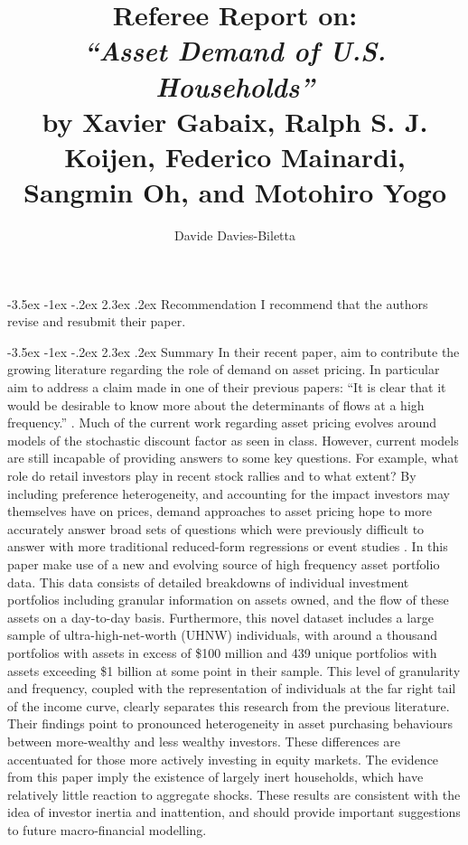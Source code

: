 \documentclass[]{article}
\title{Referee Report on:\\
	 \textit{``Asset Demand of U.S. Households''}\\
	 \bb
	  \large{by Xavier Gabaix, Ralph S. J. Koijen, Federico Mainardi, Sangmin Oh, and Motohiro Yogo}}
\author{Davide Davies-Biletta}
\makeatletter
\renewcommand\section{\leftskip 0pt\@startsection {section}{1}{\z@}%
	{-3.5ex \@plus -1ex \@minus -.2ex}%
	{2.3ex \@plus.2ex}%
	{\normalfont\Large\bfseries}}
\makeatother
\begin{document}
\vspace{50ex}

\maketitle
\thispagestyle{empty}
\pagebreak
{}
\begin{spacing}{1.25}
\section{Recommendation}
I recommend that the authors revise and resubmit their paper.

\section{Summary}
In their recent paper, \cite{gabaix2024asset} aim to contribute the growing literature regarding the role of demand on asset pricing. In particular aim to address a claim made in one of their previous papers: ``It is clear that it would be desirable to know more about the determinants of flows at a high frequency.'' \parencite{gabaix2021search}.  Much of the current work regarding asset pricing evolves around models of the stochastic discount factor as seen in class. However, current models are still incapable of providing answers to some key questions. For example, what role do retail investors play in recent stock rallies and to what extent? By including preference heterogeneity, and accounting for the impact investors may themselves have on prices, demand approaches to asset pricing hope to more accurately answer broad sets of questions which were previously difficult to answer with more traditional reduced-form regressions or event studies \parencite{koijen2019demand}. In this paper \cite{gabaix2024asset} make use of a new and evolving source of high frequency asset portfolio data. This data consists of detailed breakdowns of individual investment portfolios including granular information on assets owned, and the flow of these assets on a day-to-day basis. Furthermore, this novel dataset includes a large sample of ultra-high-net-worth (UHNW) individuals, with around a thousand portfolios with assets in excess of \$100 million and 439 unique portfolios with assets exceeding \$1 billion at some point in their sample. This level of granularity and frequency, coupled with the representation of individuals at the far right tail of the income curve, clearly separates this research from the previous literature.  
 Their findings point to pronounced heterogeneity in asset purchasing behaviours between more-wealthy and less wealthy investors. These differences are accentuated for those more actively investing in equity markets. The evidence from this paper imply the existence of largely inert households, which have relatively little reaction to aggregate shocks. These results are consistent with the idea of investor inertia and inattention, and should provide important suggestions to future macro-financial modelling. 



\end{spacing}
\end{document}
